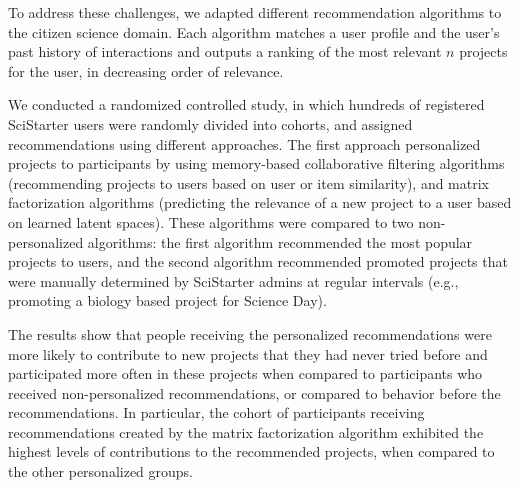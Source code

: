 \documentclass[letterpaper]{article} %
\begin{document}
 To address these challenges, we adapted  different recommendation algorithms to the citizen science domain. Each algorithm matches a user profile and the user's past history of interactions and outputs a ranking of the most relevant $n$  projects   for the user, in decreasing order of relevance.




We conducted a randomized controlled study, in which hundreds of registered SciStarter users were randomly divided into cohorts,
and
assigned recommendations using different approaches.
The first approach personalized projects to participants by  using  memory-based collaborative filtering algorithms  (recommending projects to users based on user or item similarity),  and matrix factorization algorithms (predicting the
relevance of a new  project to a user based on learned latent spaces).
These algorithms were compared to two non-personalized algorithms:
the first algorithm recommended the most popular projects to users, and the second algorithm
recommended  promoted    projects that were manually determined by  SciStarter admins at regular intervals (e.g., promoting a biology based project for Science Day).

The results show that  people receiving the personalized recommendations  were more likely  to contribute to new projects that they had never tried before and participated more often in
these projects  when compared to participants who received non-personalized recommendations, or compared to behavior before
the recommendations. In particular, the cohort of participants receiving recommendations created by the matrix factorization algorithm exhibited the highest levels of contributions to the recommended projects, when compared to the other personalized groups.
\end{document}

